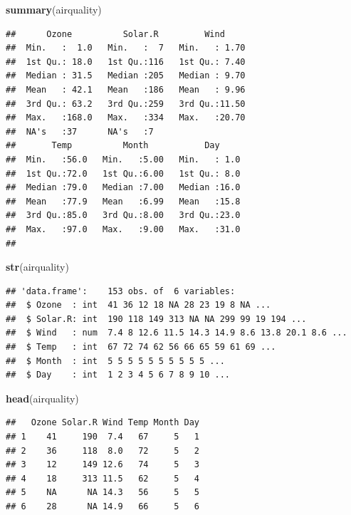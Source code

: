 \documentclass[]{book}
\newenvironment{Shaded}{\begin{snugshade}}{\end{snugshade}}
\newcommand{\KeywordTok}[1]{\textcolor[rgb]{0.13,0.29,0.53}{\textbf{#1}}}
\newcommand{\NormalTok}[1]{#1}
\theoremstyle{definition}
\theoremstyle{definition}
\theoremstyle{definition}
\theoremstyle{remark}
\begin{document}
\begin{Shaded}
\begin{Highlighting}[]
\KeywordTok{summary}\NormalTok{(airquality)}
\end{Highlighting}
\end{Shaded}

\begin{verbatim}
##      Ozone          Solar.R         Wind      
##  Min.   :  1.0   Min.   :  7   Min.   : 1.70  
##  1st Qu.: 18.0   1st Qu.:116   1st Qu.: 7.40  
##  Median : 31.5   Median :205   Median : 9.70  
##  Mean   : 42.1   Mean   :186   Mean   : 9.96  
##  3rd Qu.: 63.2   3rd Qu.:259   3rd Qu.:11.50  
##  Max.   :168.0   Max.   :334   Max.   :20.70  
##  NA's   :37      NA's   :7                    
##       Temp          Month           Day      
##  Min.   :56.0   Min.   :5.00   Min.   : 1.0  
##  1st Qu.:72.0   1st Qu.:6.00   1st Qu.: 8.0  
##  Median :79.0   Median :7.00   Median :16.0  
##  Mean   :77.9   Mean   :6.99   Mean   :15.8  
##  3rd Qu.:85.0   3rd Qu.:8.00   3rd Qu.:23.0  
##  Max.   :97.0   Max.   :9.00   Max.   :31.0  
## 
\end{verbatim}

\begin{Shaded}
\begin{Highlighting}[]
\KeywordTok{str}\NormalTok{(airquality)}
\end{Highlighting}
\end{Shaded}

\begin{verbatim}
## 'data.frame':    153 obs. of  6 variables:
##  $ Ozone  : int  41 36 12 18 NA 28 23 19 8 NA ...
##  $ Solar.R: int  190 118 149 313 NA NA 299 99 19 194 ...
##  $ Wind   : num  7.4 8 12.6 11.5 14.3 14.9 8.6 13.8 20.1 8.6 ...
##  $ Temp   : int  67 72 74 62 56 66 65 59 61 69 ...
##  $ Month  : int  5 5 5 5 5 5 5 5 5 5 ...
##  $ Day    : int  1 2 3 4 5 6 7 8 9 10 ...
\end{verbatim}

\begin{Shaded}
\begin{Highlighting}[]
\KeywordTok{head}\NormalTok{(airquality)}
\end{Highlighting}
\end{Shaded}

\begin{verbatim}
##   Ozone Solar.R Wind Temp Month Day
## 1    41     190  7.4   67     5   1
## 2    36     118  8.0   72     5   2
## 3    12     149 12.6   74     5   3
## 4    18     313 11.5   62     5   4
## 5    NA      NA 14.3   56     5   5
## 6    28      NA 14.9   66     5   6
\end{verbatim}
\end{document}
